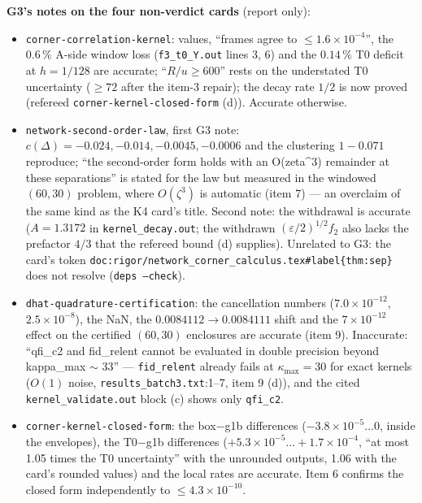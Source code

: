 \documentclass[11pt]{article}
\begin{document}
\textbf{G3's notes on the four non-verdict cards} (report only):
\begin{itemize}[leftmargin=*]
\item \texttt{corner-correlation-kernel}: values, ``frames agree to $\le1.6\times10^{-4}$'', the $0.6\,\%$ A-side window loss
(\texttt{f3\_t0\_Y.out} lines 3, 6) and the $0.14\,\%$ T0 deficit at $h=1/128$ are accurate; ``$R/u\ge600$'' rests on the
understated T0 uncertainty ($\ge72$ after the item-3 repair); the decay rate $1/2$ is now proved (refereed
\texttt{corner-kernel-closed-form} (d)). Accurate otherwise.
\item \texttt{network-second-order-law}, first G3 note: $c(\Delta)=-0.024,-0.014,-0.0045,-0.0006$ and the clustering
$1-0.071$ reproduce; ``the second-order form holds with an O(zeta\^{}3) remainder at these separations'' is stated for the law
but measured in the windowed $(60,30)$ problem, where $O(\zeta^3)$ is automatic (item 7) --- an overclaim of the same kind as
the K4 card's title. Second note: the withdrawal is accurate ($A=1.3172$ in \texttt{kernel\_decay.out}; the withdrawn
$(\varepsilon/2)^{1/2}f_2$ also lacks the prefactor $4/3$ that the refereed bound (d) supplies). Unrelated to G3: the card's
token \texttt{doc:rigor/network\_corner\_calculus.tex\#label\{thm:sep\}} does not resolve (\texttt{deps --check}).
\item \texttt{dhat-quadrature-certification}: the cancellation numbers ($7.0\times10^{-12}$, $2.5\times10^{-8}$), the NaN, the
$0.0084112\to0.0084111$ shift and the $7\times10^{-12}$ effect on the certified $(60,30)$ enclosures are accurate (item 9).
Inaccurate: ``qfi\_c2 and fid\_relent cannot be evaluated in double precision beyond kappa\_max $\sim$ 33'' --- \texttt{fid\_relent}
already fails at $\kappa_{\max}=30$ for exact kernels ($O(1)$ noise, \texttt{results\_batch3.txt}:1--7, item 9 (d)), and the cited
\texttt{kernel\_validate.out} block (c) shows only \texttt{qfi\_c2}.
\item \texttt{corner-kernel-closed-form}: the box$-$g1b differences ($-3.8\times10^{-5}\ldots0$, inside the envelopes), the
T0$-$g1b differences ($+5.3\times10^{-5}\ldots+1.7\times10^{-4}$, ``at most 1.05 times the T0 uncertainty'' with the
unrounded outputs, 1.06 with the card's rounded values) and the local rates are accurate. Item 6 confirms the closed form
independently to $\le4.3\times10^{-10}$.
\end{itemize}
\end{document}
